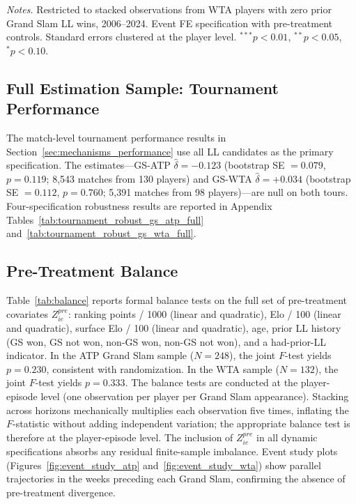 \begin{table}[htbp]
\centering
\caption{First-LL-Only WTA Grand Slam: Dynamic Effects}
\label{tab:firstll_wta}
\begin{threeparttable}
\small

\begin{tablenotes}
\footnotesize
\item \textit{Notes.} Restricted to stacked observations from WTA players with zero prior Grand Slam LL wins, 2006--2024. Event FE specification with pre-treatment controls. Standard errors clustered at the player level. $^{***}p<0.01$, $^{**}p<0.05$, $^{*}p<0.10$.
\end{tablenotes}
\end{threeparttable}
\end{table}

\subsection{Full Estimation Sample: Tournament Performance}
\label{sec:robustness_fullsample_tournament}

The match-level tournament performance results in Section~\ref{sec:mechanisms_performance} use all LL candidates as the primary specification. The estimates---GS-ATP $\hat{\delta} = -0.123$ (bootstrap SE $= 0.079$, $p = 0.119$; 8,543 matches from 130 players) and GS-WTA $\hat{\delta} = +0.034$ (bootstrap SE $= 0.112$, $p = 0.760$; 5,391 matches from 98 players)---are null on both tours. Four-specification robustness results are reported in Appendix Tables~\ref{tab:tournament_robust_gs_atp_full} and~\ref{tab:tournament_robust_gs_wta_full}.

\subsection{Pre-Treatment Balance}
\label{sec:robustness_balance}

Table~\ref{tab:balance} reports formal balance tests on the full set of pre-treatment covariates $Z^{pre}_{ie}$: ranking points / 1000 (linear and quadratic), Elo / 100 (linear and quadratic), surface Elo / 100 (linear and quadratic), age, prior LL history (GS won, GS not won, non-GS won, non-GS not won), and a had-prior-LL indicator. In the ATP Grand Slam sample ($N = 248$), the joint $F$-test yields $p = 0.230$, consistent with randomization. In the WTA sample ($N = 132$), the joint $F$-test yields $p = 0.333$. The balance tests are conducted at the player-episode level (one observation per player per Grand Slam appearance). Stacking across horizons mechanically multiplies each observation five times, inflating the $F$-statistic without adding independent variation; the appropriate balance test is therefore at the player-episode level. The inclusion of $Z^{pre}_{ie}$ in all dynamic specifications absorbs any residual finite-sample imbalance. Event study plots (Figures~\ref{fig:event_study_atp} and~\ref{fig:event_study_wta}) show parallel trajectories in the weeks preceding each Grand Slam, confirming the absence of pre-treatment divergence.

